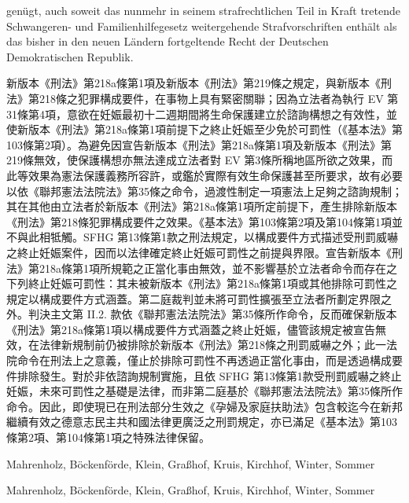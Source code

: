 \documentclass[12pt]{article}
\begin{document}
\begin{sourcepara}[title={原文E.266}]
genügt, auch soweit das nunmehr in seinem strafrechtlichen Teil in Kraft tretende Schwangeren- und Familienhilfegesetz weitergehende Strafvorschriften enthält als das bisher in den neuen Ländern fortgeltende Recht der Deutschen Demokratischen Republik.
\end{sourcepara}
\begin{transpara}
新版本《刑法》第218a條第1項及新版本《刑法》第219條之規定，與新版本《刑法》第218條之犯罪構成要件，在事物上具有緊密關聯；因為立法者為執行 EV 第31條第4項，意欲在妊娠最初十二週期間將生命保護建立於諮詢構想之有效性，並使新版本《刑法》第218a條第1項前提下之終止妊娠至少免於可罰性（《基本法》第103條第2項\ggfnArtOneZeroThreeTwoZH{}）。為避免因宣告新版本《刑法》第218a條第1項及新版本《刑法》第219條無效，使保護構想亦無法達成立法者對 EV 第3條所稱地區所欲之效果，而此等效果為憲法保護義務所容許，或鑑於實際有效生命保護甚至所要求，故有必要以依《聯邦憲法法院法》第35條之命令，過渡性制定一項憲法上足夠之諮詢規制；其在其他由立法者於新版本《刑法》第218a條第1項所定前提下，產生排除新版本《刑法》第218條犯罪構成要件之效果。《基本法》第103條第2項\ggfnArtOneZeroThreeTwoZH{}及第104條第1項\ggfnArtOneZeroFourOneZH{}並不與此相牴觸。SFHG 第13條第1款之刑法規定，以構成要件方式描述受刑罰威嚇之終止妊娠案件，因而以法律確定終止妊娠可罰性之前提與界限。宣告新版本《刑法》第218a條第1項所規範之正當化事由無效，並不影響基於立法者命令而存在之下列終止妊娠可罰性：其未被新版本《刑法》第218a條第1項或其他排除可罰性之規定以構成要件方式涵蓋。第二庭裁判並未將可罰性擴張至立法者所劃定界限之外。判決主文第 II.2. 款依《聯邦憲法法院法》第35條所作命令，反而確保新版本《刑法》第218a條第1項以構成要件方式涵蓋之終止妊娠，儘管該規定被宣告無效，在法律新規制前仍被排除於新版本《刑法》第218條之刑罰威嚇之外；此一法院命令在刑法上之意義，僅止於排除可罰性不再透過正當化事由，而是透過構成要件排除發生。對於非依諮詢規制實施，且依 SFHG 第13條第1款受刑罰威嚇之終止妊娠，未來可罰性之基礎是法律，而非第二庭基於《聯邦憲法法院法》第35條所作命令。因此，即使現已在刑法部分生效之《孕婦及家庭扶助法》包含較迄今在新邦繼續有效之德意志民主共和國法律更廣泛之刑罰規定，亦已滿足《基本法》第103條第2項\ggfnArtOneZeroThreeTwoZH{}、第104條第1項\ggfnArtOneZeroFourOneZH{}之特殊法律保留。
\end{transpara}

\begin{sourcepara}[title={原文E.267}]
Mahrenholz, Böckenförde, Klein, Graßhof, Kruis, Kirchhof, Winter, Sommer
\end{sourcepara}
\begin{transpara}
Mahrenholz, Böckenförde, Klein, Graßhof, Kruis, Kirchhof, Winter, Sommer
\end{transpara}
\end{document}
